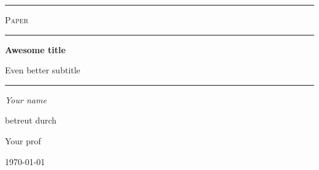 \begin{titlepage}
    \centering
    \vspace{0.2cm}
    {\color{fhdo}\hrule height 0.5pt\relax}
    \vspace{0.5cm}
    {\scshape Paper\par}
    \vfill
    {\color{fhdo}\rule{0.8\textwidth}{0.1pt}\par}
    \vspace{0.5cm}
    {\LARGE\bfseries Awesome title\par}
    \vspace{0.2cm}
    {\Large Even better subtitle\par}
    \vspace{0.5cm}
    {\color{fhdo}\rule{0.8\textwidth}{0.1pt}\par}
    \vspace{0.5cm}
    {\Large\emph{Your name}\par}
    \vfill
    betreut durch\par
    Your prof\par
    \vspace{2cm}
    {\today\par}
\end{titlepage}
\restoregeometry{}